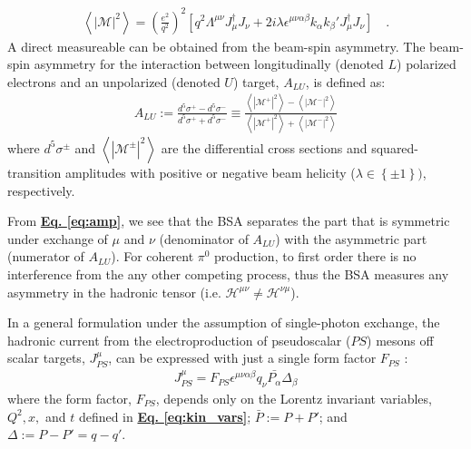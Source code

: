 \documentclass[10pt,prd,aps,showpacs,twocolumn,unsortedaddress]{revtex4-1}
\newcommand\pio{{\pi^0}}
\newcommand\lr[1]{\left( #1\right) }
\newcommand\lrb[1]{\left[ #1\right] }
\newcommand\lrB[1]{\left\{ #1\right\} }
\newcommand\lra[1]{\left< #1\right> }
\newcommand\abv[1]{\left|#1 \right|}
\renewcommand\b[1]{{\textbf{#1}}}
\renewcommand\u[1]{{\underline{#1}}}
\newcommand\Eq [1]{\b{\u{Eq. #1}}}
\begin{document}
  \begin{align}
    \lra{ \abv{ \mathcal{M}}^2 } = \lr{\frac{e^2}{q^2}}^2 \lrb{ q^2\Lambda^{\mu\nu}J^\dagger_\mu J_\nu 
    + 2i\lambda\epsilon^{\mu\nu\alpha\beta}k_\alpha k_\beta' J^\dagger_\mu J_\nu } \quad .
    \label{eq:amp}
  \end{align}
  A direct measureable can be obtained from the beam-spin asymmetry. 
  The beam-spin asymmetry for the interaction between longitudinally (denoted $L$) polarized electrons 
  and an unpolarized (denoted $U$) target, $A_{LU}$, is defined as:
	\begin{align} 
    A_{LU} := \frac{ d^5\sigma^+ - d^5\sigma^-}{ d^5\sigma^+ + d^5\sigma^-} 
    \equiv \frac{ \lra{ \abv{ \mathcal{M^+}}^2 } - \lra{ \abv{ \mathcal{M^-}}^2 } }
    { \lra{ \abv{ \mathcal{M^+}}^2 } + \lra{ \abv{ \mathcal{M^-}}^2 }}
    \label{eq:alu}
  \end{align}
	where $d^5\sigma^{\pm}$ and $\lra{ \abv{ \mathcal{M^{\pm}}}^2 }$ are the differential cross sections 
  and squared-transition amplitudes with positive or negative beam helicity ($\lambda \in \lrB{\pm 1})$, respectively. 

  From \Eq{\ref{eq:amp}}, we see that the BSA separates the part that is symmetric under exchange of $\mu$ and $\nu$ (denominator of $A_{LU}$) 
  with the asymmetric part (numerator of $A_{LU}$). 
  For coherent $\pio$ production, to first order there is no interference from the any other competing process, 
  thus the BSA measures any asymmetry in the hadronic tensor (i.e. $\mathcal H ^{\mu\nu} \neq \mathcal H^{\nu\mu}$).
  
  In a general formulation under the assumption of single-photon exchange,
  the hadronic current from the electroproduction of pseudoscalar ($PS$) mesons off scalar targets, 
  $J^\mu_{PS}$, can be expressed with just a single form factor $F_{PS}$ \cite{ji}:
  \begin{align*}
    J^\mu_{PS} = F_{PS} \epsilon^{\mu\nu\alpha\beta}q_\nu {\bar{P_\alpha}}\Delta_\beta
  \end{align*}
  where the form factor, $F_{PS}$, depends only on the Lorentz invariant variables, 
  $Q^2, x,$ and $t$ defined in \Eq{\ref{eq:kin_vars}}; $\bar P := P + P'$; and $\Delta := P - P' = q - q'$.
\end{document}

